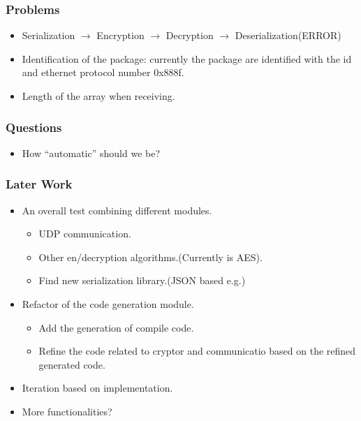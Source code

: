 \documentclass[11pt]{beamer}
\begin{document}
\begin{frame}
\begin{multicols}{2}
\end{multicols}
\end{frame}

\begin{frame}\frametitle{Problems}
\begin{itemize}
\item Serialization $\rightarrow$ Encryption $\rightarrow$ Decryption $\rightarrow$ Deserialization(ERROR)

\item Identification of the package: currently the package are identified with the  id and ethernet protocol number 0x888f.

\item Length of the array when receiving.
\end{itemize}
\end{frame}

\begin{frame}\frametitle{Questions}
\begin{itemize}
\item How ``automatic'' should we be?

\end{itemize}
\end{frame}

\begin{frame}\frametitle{Later Work}
\begin{itemize}
\item An overall test combining different modules.
\begin{itemize}
\item UDP communication.
\item Other en/decryption algorithms.(Currently is AES).

\item Find new serialization library.(JSON based e.g.)
\end{itemize}

\item Refactor of the code generation module.
\begin{itemize}
\item Add the generation of compile code.
\item Refine the code related to cryptor and communicatio based on the refined generated code.
\end{itemize}
\item Iteration based on implementation.

\item More functionalities?
\end{itemize}
\end{frame}
\end{document}
